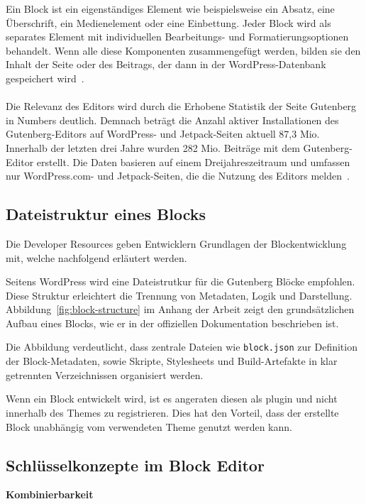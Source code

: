 Ein Block ist ein eigenständiges Element wie beispielsweise ein Absatz, eine Überschrift, ein Medienelement oder eine Einbettung.
Jeder Block wird als separates Element mit individuellen Bearbeitungs- und Formatierungsoptionen behandelt.
Wenn alle diese Komponenten zusammengefügt werden, bilden sie den Inhalt der Seite oder des Beitrags, der dann in der WordPress-Datenbank gespeichert wird~\cite{wordpress2024plugin_blockeditor}.
\\
\\
Die Relevanz des Editors wird durch die Erhobene Statistik der Seite Gutenberg in Numbers deutlich.
Demnach beträgt die Anzahl aktiver Installationen des Gutenberg-Editors auf WordPress- und Jetpack-Seiten aktuell 87,3 Mio.
Innerhalb der letzten drei Jahre wurden 282 Mio. Beiträge mit dem Gutenberg-Editor erstellt.
Die Daten basieren auf einem Dreijahreszeitraum und umfassen nur WordPress.com- und Jetpack-Seiten, die die Nutzung des Editors melden~\cite{gutenstats}.

\subsection{Dateistruktur eines Blocks}
Die Developer Resources geben Entwicklern Grundlagen der Blockentwicklung mit, welche nachfolgend erläutert werden.

Seitens WordPress wird eine Dateistrutkur für die Gutenberg Blöcke empfohlen.
Diese Struktur erleichtert die Trennung von Metadaten, Logik und Darstellung.
Abbildung~\ref{fig:block-structure} im Anhang der Arbeit zeigt den grundsätzlichen Aufbau eines Blocks, wie er in der offiziellen Dokumentation beschrieben ist.

Die Abbildung verdeutlicht, dass zentrale Dateien wie \texttt{block.json} zur Definition der Block-Metadaten,
sowie Skripte, Stylesheets und Build-Artefakte in klar getrennten Verzeichnissen organisiert werden.



Wenn ein Block entwickelt wird, ist es angeraten diesen als \gls{plugin} und nicht innerhalb des Themes zu registrieren.
Dies hat den Vorteil, dass der erstellte Block unabhängig vom verwendeten Theme genutzt werden kann.
\subsection{Schlüsselkonzepte im Block Editor}
\textbf{Kombinierbarkeit}

